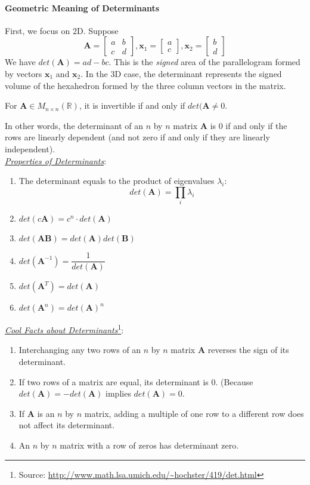 \paragraph{Geometric Meaning of Determinants}
First, we focus on 2D. Suppose
\[
\bm{A}=\begin{bmatrix}
a & b\\
c & d
\end{bmatrix},
\bm{x}_1=\begin{bmatrix}
a\\
c
\end{bmatrix},
\bm{x}_2=\begin{bmatrix}
b\\
d
\end{bmatrix}
\]
We have $det(\bm{A})=ad-bc$. This is the \emph{signed} area of the parallelogram formed by vectors $\bm{x}_1$ and $\bm{x}_2$. In the 3D case, the determinant represents the signed volume of the hexahedron formed by the three column vectors in the matrix. 

\begin{theorem}
For $\bm{A}\in M_{n\times n}(\mathbb{R})$, it is invertible if and only if $det(\bm{A}\neq 0$.
\end{theorem}

In other words, the determinant of an $n$ by $n$ matrix $\bm{A}$ is 0 if and only if the rows are linearly dependent (and not zero if and only if they are linearly independent).\\

\noindent\underline{\textit{Properties of Determinants}}:
\begin{enumerate}[label=\alph*)]
    \item The determinant equals to the product of eigenvalues $\lambda_i$:
        \[ det(\bm{A}) = \prod_i\lambda_i \]
    \item $det(c\bm{A})=c^n\cdot det(\bm{A})$
    \item $det(\bm{AB})=det(\bm{A})det(\bm{B})$
    \item $det(\bm{A}^{-1})=\dfrac{1}{det(\bm{A})}$
    \item $det(\bm{A}^T)=det(\bm{A})$
    \item $det(\bm{A}^n)=det(\bm{A})^n$
\end{enumerate}

\noindent\underline{\textit{Cool Facts about Determinants}}\footnote{Source: \url{http://www.math.lsa.umich.edu/~hochster/419/det.html}}:
\begin{enumerate}[label=\theenumi)]
    \item Interchanging any two rows of an $n$ by $n$ matrix $\bm{A}$ reverses the sign of its determinant.
    \item If two rows of a matrix are equal, its determinant is 0. (Because $det(\bm{A})=-det(\bm{A})$ implies $det(\bm{A})=0$.
    \item If $\bm{A}$ is an $n$ by $n$ matrix, adding a multiple of one row to a different row does not affect its determinant.
    \item An $n$ by $n$ matrix with a row of zeros has determinant zero.
\end{enumerate}

